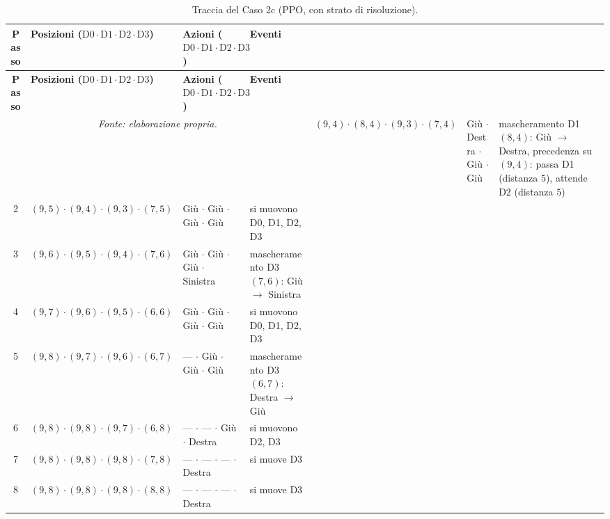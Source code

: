 \documentclass[12pt,a4paper,twoside]{report}
\begin{document}
{\footnotesize
\setlength{\tabcolsep}{3.5pt}
\begin{longtable}{c l l >{\raggedright\arraybackslash}p{3.8cm}}
\caption{Traccia del Caso 2c (PPO, con strato di risoluzione).}\\
\toprule
\textbf{Passo} & \textbf{Posizioni ($\text{D0} \cdot \text{D1} \cdot \text{D2} \cdot \text{D3}$)} & \textbf{Azioni ($\text{D0} \cdot \text{D1} \cdot \text{D2} \cdot \text{D3}$)} & \textbf{Eventi} \\
\midrule
\endfirsthead
\toprule
\textbf{Passo} & \textbf{Posizioni ($\text{D0} \cdot \text{D1} \cdot \text{D2} \cdot \text{D3}$)} & \textbf{Azioni ($\text{D0} \cdot \text{D1} \cdot \text{D2} \cdot \text{D3}$)} & \textbf{Eventi} \\
\midrule
\endhead
\bottomrule
\multicolumn{4}{c}{\footnotesize\emph{Fonte: elaborazione propria.}}
\endlastfoot
1 & $(9, 4) \cdot (8, 4) \cdot (9, 3) \cdot (7, 4)$ & Giù $\cdot$ Destra $\cdot$ Giù $\cdot$ Giù   & mascheramento D1$(8, 4)$: Giù $\to$ Destra, precedenza su $(9, 4)$: passa D1 (distanza $5$), attende D2 (distanza $5$) \\
2 & $(9, 5) \cdot (9, 4) \cdot (9, 3) \cdot (7, 5)$ & Giù $\cdot$ Giù $\cdot$ Giù $\cdot$ Giù      & si muovono D0, D1, D2, D3 \\
3 & $(9, 6) \cdot (9, 5) \cdot (9, 4) \cdot (7, 6)$ & Giù $\cdot$ Giù $\cdot$ Giù $\cdot$ Sinistra & mascheramento D3$(7, 6)$: Giù $\to$ Sinistra \\
4 & $(9, 7) \cdot (9, 6) \cdot (9, 5) \cdot (6, 6)$ & Giù $\cdot$ Giù $\cdot$ Giù $\cdot$ Giù      & si muovono D0, D1, D2, D3 \\
5 & $(9, 8) \cdot (9, 7) \cdot (9, 6) \cdot (6, 7)$ & --- $\cdot$ Giù $\cdot$ Giù $\cdot$ Giù      & mascheramento D3$(6, 7)$: Destra $\to$ Giù \\
6 & $(9, 8) \cdot (9, 8) \cdot (9, 7) \cdot (6, 8)$ & --- $\cdot$ --- $\cdot$ Giù $\cdot$ Destra   & si muovono D2, D3 \\
7 & $(9, 8) \cdot (9, 8) \cdot (9, 8) \cdot (7, 8)$ & --- $\cdot$ --- $\cdot$ --- $\cdot$ Destra   & si muove D3 \\*
8 & $(9, 8) \cdot (9, 8) \cdot (9, 8) \cdot (8, 8)$ & --- $\cdot$ --- $\cdot$ --- $\cdot$ Destra   & si muove D3 \\*
\end{longtable}
}

\end{document}
